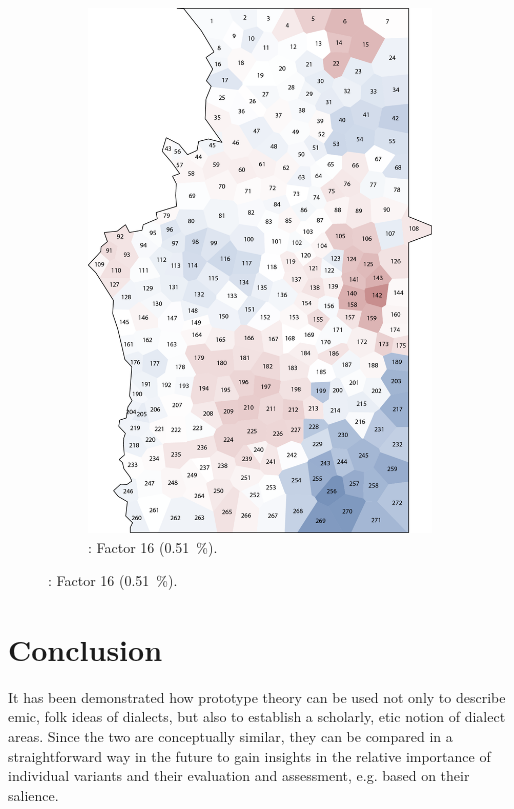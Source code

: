\documentclass[output=paper]{LSP/langsci}
\begin{document}
\begin{figure}
\begin{subfigure}[t]{0.3\textwidth}
\includegraphics[width=\textwidth]{illustrations/pickl_fig18}
\caption{: Factor 16 (0.51~\%).}
\label{fig:18}
\end{subfigure}
\end{figure}

\section{Conclusion}
It has been demonstrated how prototype theory can be used not only to describe emic, folk ideas of dialects, but also to establish a scholarly, etic notion of dialect areas. Since the two are conceptually similar, they can be compared in a straightforward way in the future to gain insights in the relative importance of individual variants and their evaluation and assessment, e.g. based on their salience.
\end{document}
